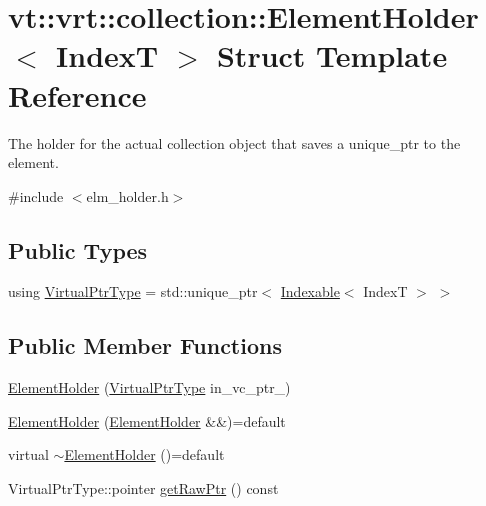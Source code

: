 \hypertarget{structvt_1_1vrt_1_1collection_1_1_element_holder}{}\section{vt\+:\+:vrt\+:\+:collection\+:\+:Element\+Holder$<$ IndexT $>$ Struct Template Reference}
\label{structvt_1_1vrt_1_1collection_1_1_element_holder}


The holder for the actual collection object that saves a unique\+\_\+ptr to the element.  




{\ttfamily \#include $<$elm\+\_\+holder.\+h$>$}

\subsection*{Public Types}
\begin{DoxyCompactItemize}
\item 
using \hyperlink{structvt_1_1vrt_1_1collection_1_1_element_holder_aab2fd054199e1fed22be78fa1969eb2c}{Virtual\+Ptr\+Type} = std\+::unique\+\_\+ptr$<$ \hyperlink{structvt_1_1vrt_1_1collection_1_1_indexable}{Indexable}$<$ IndexT $>$ $>$
\end{DoxyCompactItemize}
\subsection*{Public Member Functions}
\begin{DoxyCompactItemize}
\item 
\hyperlink{structvt_1_1vrt_1_1collection_1_1_element_holder_aba2cf4951626be16bd2b2c4e52b8d4f5}{Element\+Holder} (\hyperlink{structvt_1_1vrt_1_1collection_1_1_element_holder_aab2fd054199e1fed22be78fa1969eb2c}{Virtual\+Ptr\+Type} in\+\_\+vc\+\_\+ptr\+\_\+)
\item 
\hyperlink{structvt_1_1vrt_1_1collection_1_1_element_holder_a36b03582059f06e1e9d60d5c38b53338}{Element\+Holder} (\hyperlink{structvt_1_1vrt_1_1collection_1_1_element_holder}{Element\+Holder} \&\&)=default
\item 
virtual \hyperlink{structvt_1_1vrt_1_1collection_1_1_element_holder_a9f8f4304168ecb1a0b13f2b58a0abd0b}{$\sim$\+Element\+Holder} ()=default
\item 
Virtual\+Ptr\+Type\+::pointer \hyperlink{structvt_1_1vrt_1_1collection_1_1_element_holder_a4fcba6438d97c525ff5f73d372a31133}{get\+Raw\+Ptr} () const
\end{DoxyCompactItemize}
